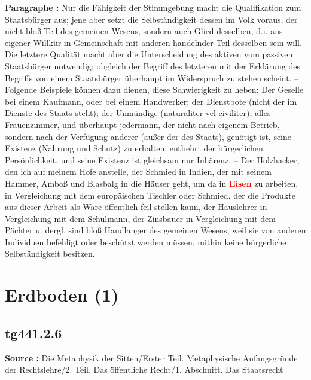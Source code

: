 \documentclass[a4paper,12pt,twoside]{book}
\newcommand{\match}[1]{\textcolor{red}{\textbf{#1}}}
\newcommand{\unnumberedsection}[1]{
	\section*{#1}
	\addcontentsline{toc}{section}{#1}
	\markright{#1}
}
\begin{document}
	\textbf{Paragraphe : }Nur die Fähigkeit der Stimmgebung macht die Qualifikation zum Staatsbürger aus; jene aber setzt die Selbständigkeit dessen im Volk voraus, der nicht bloß Teil des gemeinen Wesens, sondern auch Glied desselben, d.i. aus eigener Willkür in Gemeinschaft mit anderen handelnder  Teil desselben sein will. Die letztere Qualität macht aber die Unterscheidung des aktiven vom passiven Staatsbürger notwendig: obgleich der Begriff des letzteren mit der Erklärung des Begriffs von einem Staatsbürger überhaupt im Widerspruch zu stehen scheint. – Folgende Beispiele können dazu dienen, diese Schwierigkeit zu heben: Der Geselle bei einem Kaufmann, oder bei einem Handwerker; der Dienstbote (nicht der im Dienste des Staats steht); der Unmündige (naturaliter vel civiliter); alles Frauenzimmer, und überhaupt jedermann, der nicht nach eigenem Betrieb, sondern nach der Verfügung anderer (außer der des Staats), genötigt ist, seine Existenz (Nahrung und Schutz) zu erhalten, entbehrt der bürgerlichen Persönlichkeit, und seine Existenz ist gleichsam nur Inhärenz. – Der Holzhacker, den ich auf meinem Hofe anstelle, der Schmied in Indien, der mit seinem Hammer, Amboß und Blasbalg in die Häuser geht, um da in \match{Eisen} zu arbeiten, in Vergleichung mit dem europäischen Tischler oder Schmied, der die Produkte aus dieser Arbeit als Ware öffentlich feil stellen kann, der Hauslehrer in Vergleichung mit dem Schulmann, der Zinsbauer in Vergleichung mit dem Pächter u. dergl. sind bloß Handlanger des gemeinen Wesens, weil sie von anderen Individuen befehligt oder beschützt werden müssen, mithin keine bürgerliche Selbständigkeit besitzen. 
	
	\unnumberedsection{Erdboden (1)} 
	\subsection*{tg441.2.6} 
	\textbf{Source : }Die Metaphysik der Sitten/Erster Teil. Metaphysische Anfangsgründe der Rechtslehre/2. Teil. Das öffentliche Recht/1. Abschnitt. Das Staatsrecht\\  
	
\end{document}
